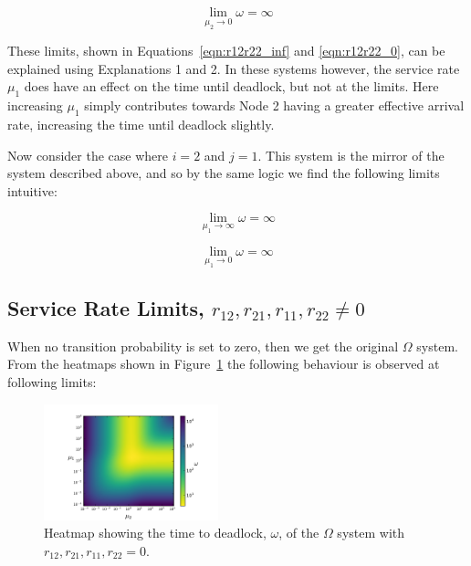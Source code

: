 \documentclass{article}
\begin{document}
\begin{equation}\label{eqn:r12r22_0}
\lim_{\mu_2 \to 0} \omega = \infty
\end{equation}

These limits, shown in Equations~\ref{eqn:r12r22_inf} and \ref{eqn:r12r22_0}, can be explained using Explanations 1 and 2.
In these systems however, the service rate $\mu_1$ does have an effect on the time until deadlock, but not at the limits. Here increasing $\mu_1$ simply contributes towards Node 2 having a greater effective arrival rate, increasing the time until deadlock slightly.

Now consider the case where $i = 2$ and $j = 1$.
This system is the mirror of the system described above, and so by the same logic we find the following limits intuitive:

\begin{equation}\label{eqn:r11r21_inf}
\lim_{\mu_1 \to \infty} \omega = \infty
\end{equation}

\begin{equation}\label{eqn:r11r21_0}
\lim_{\mu_1 \to 0} \omega = \infty
\end{equation}


\subsection{Service Rate Limits, $r_{12}, r_{21}, r_{11}, r_{22} \neq 0$}\label{sec:r11r12r21r22}

When no transition probability is set to zero, then we get the original $\Omega$ system.
From the heatmaps shown in Figure~\ref{fig:r11r12r21r22} the following behaviour is observed at following limits:

\begin{figure}[htbp!]
	\begin{center}
		\includegraphics[width=0.45\textwidth]{images/r11r12r21r22.pdf}
	\end{center}
	\caption{Heatmap showing the time to deadlock, $\omega$, of the $\Omega$ system with $r_{12}, r_{21}, r_{11}, r_{22} = 0$.}
	\label{fig:r11r12r21r22}
\end{figure}
\end{document}
